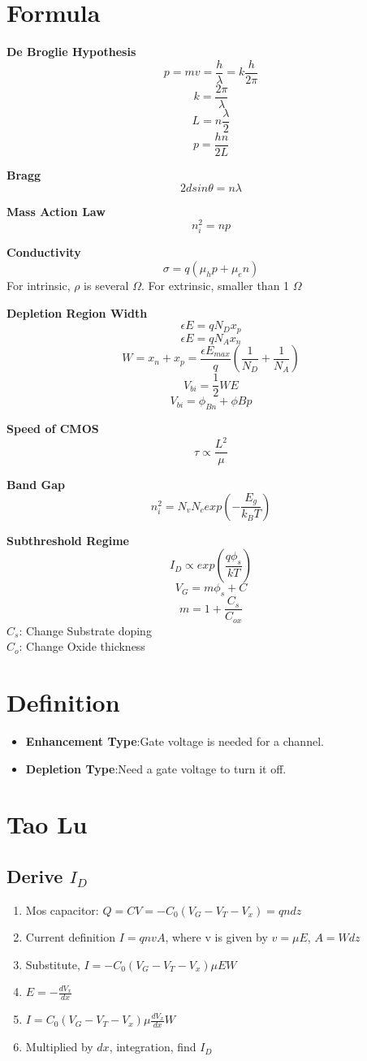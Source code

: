 \documentclass{article}
\begin{document}
\Large
  \section{Formula}
  
   \textbf{De Broglie Hypothesis}
   $$p = mv = \frac{h}{\lambda} = k\frac{h}{2\pi}$$
   $$ k = \frac{2\pi}{\lambda} $$  
   $$L = n\frac{\lambda}{2}$$
   $$ p = \frac{hn}{2L}$$
   
   \textbf{Bragg}
   $$2dsin\theta = n\lambda$$
  
  \textbf{Mass Action Law}
  $$n_i^2 = np$$
  
  \textbf{Conductivity}
  $$\sigma = q(\mu_hp+\mu_en)$$  
  For intrinsic, $\rho$ is several $\Omega$. For extrinsic, smaller than 1 $\Omega$
  
  \textbf{Depletion Region Width}
  $$ \epsilon E = qN_Dx_p $$
  $$ \epsilon E = qN_Ax_n$$ 
  $$W = x_n + x_p = \frac{\epsilon E_{max}}{q}(\frac{1}{N_D} + \frac{1}{N_A})$$
  $$V_{bi} = \frac{1}{2}WE$$
  $$V_{bi} = \phi_{Bn} + \phi{Bp}$$
  
  \textbf{Speed of CMOS}
  $$\tau \propto \frac{L^2}{\mu}$$ 
  
  \textbf{Band Gap}
  $$n_i^2 = N_vN_cexp(-\frac{E_g}{k_BT}) $$
  
  \textbf{Subthreshold Regime}
  $$I_D \propto exp(\frac{q\phi_s}{kT}) $$
  $$V_G = m\phi_s + C$$
  $$m = 1 + \frac{C_s}{C_{ox}}$$
  $C_s$: Change Substrate doping\\
  $C_o$: Change Oxide thickness
  
  \section{Definition}
  \begin{itemize}
    \item \textbf{Enhancement Type}:Gate voltage is needed for a channel.
    \item \textbf{Depletion Type}:Need a gate voltage to turn it off.
  \end{itemize}
  \section{Tao Lu}
  \subsection{Derive $I_D$}
   \begin{enumerate}
     \item Mos capacitor: $Q = CV = -C_0(V_G - V_T - V_x) = qndz$
     \item Current definition $I = qnvA$, where v is given by $v = \mu E$, $A = Wdz$
     \item Substitute, $I = -C_0(V_G - V_T - V_x)\mu E W$
     \item $E = -\frac{dV_x}{dx}$
     \item $I = C_0(V_G - V_T - V_x)\mu \frac{dV_x}{dx} W$
     \item Multiplied by $dx$, integration, find $I_D$
   \end{enumerate}
   
\end{document}
